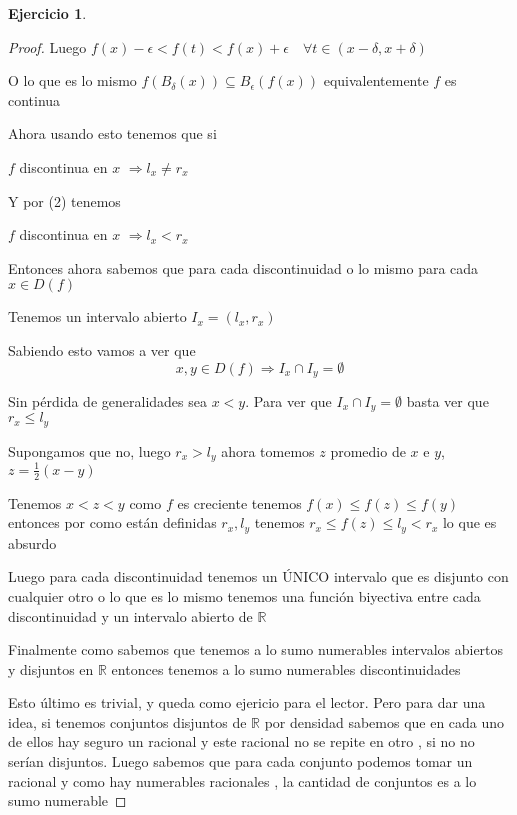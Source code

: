 \documentclass[12pt]{article}
\newcommand{\R}{\mathbb{R}}
\newcommand{\Ra}{\Rightarrow}
\theoremstyle{definition}
\newtheorem{ej}{Ejercicio}
\begin{document}
\begin{ej}
\begin{proof}
  Luego $f(x) - \epsilon < f(t) < f(x) + \epsilon \quad \forall t \in (x - \delta , x + \delta)$

  O lo que es lo mismo $f(B_{\delta}(x)) \subseteq B_{\epsilon}(f(x))$ equivalentemente $f$ es continua
 
  Ahora usando esto tenemos que si \begin{center} $f$ discontinua en $x$ $\Ra l_{x} \neq r_{x}$ \end{center}

  Y por (2) tenemos \begin{center} $f$ discontinua en $x$ $\Ra l_{x} < r_{x}$ \end{center}

  Entonces ahora sabemos que para cada discontinuidad o lo mismo para cada $x \in D(f)$

  Tenemos un intervalo abierto $I_{x} = (l_{x},r_{x})$

  Sabiendo esto vamos a ver que $$x ,y \in D(f) \Ra I_{x} \cap I_{y} = \emptyset $$

  Sin pérdida de generalidades sea $x < y$. Para ver que $I_{x} \cap I_{y} = \emptyset$ basta ver que $r_{x} \leq l_{y}$

  Supongamos que no, luego $r_{x} > l_{y}$ ahora tomemos $z$ promedio de $x$ e $y$, $z = \frac{1}{2} (x - y)$

  Tenemos $x < z < y$ como $f$ es creciente tenemos $f(x) \leq f(z) \leq f(y)$ entonces por como están definidas $r_x,l_y$  tenemos $r_{x} \leq f(z) \leq l_{y} < r_{x}$ lo que es absurdo

  Luego para cada discontinuidad tenemos un ÚNICO intervalo que es disjunto con cualquier otro  o lo que es lo mismo tenemos una función biyectiva entre cada discontinuidad y un intervalo abierto de $\R$

  Finalmente como sabemos que tenemos a lo sumo numerables intervalos abiertos y disjuntos en $\R$ entonces tenemos a lo sumo numerables discontinuidades 
  
  Esto último es trivial, y queda como ejericio para el lector. Pero para dar una idea, si tenemos conjuntos disjuntos de $\R$ por densidad sabemos que en cada uno de ellos hay seguro un racional y este racional no se repite en otro , si no no serían disjuntos. Luego sabemos que para cada conjunto podemos tomar un racional y como hay numerables racionales , la cantidad de conjuntos es a lo sumo numerable 
\end{proof}
\end{ej}
\end{document}
